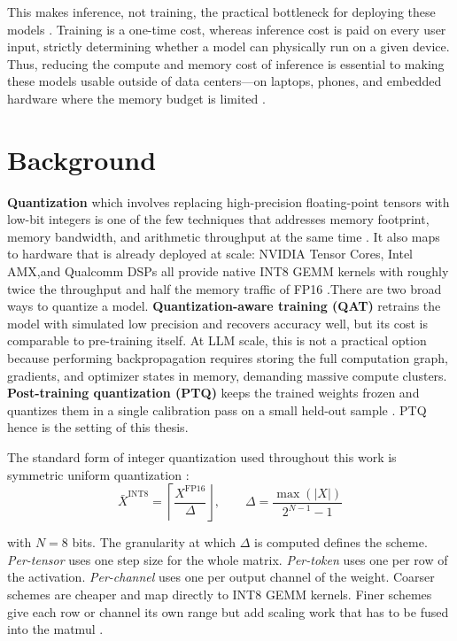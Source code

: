This makes inference, not training, the practical bottleneck for deploying these models \cite{smoothquant_paper, outlier_suppression_paper}. Training is a one-time cost, whereas inference cost is paid on every user input, strictly determining whether a model can physically run on a given device. Thus, reducing the compute and memory cost of inference is essential to making these models usable outside of data centers---on laptops, phones, and embedded hardware where the memory budget is limited \cite{llm_int8_paper, gptq_paper, awq_paper}.

\section{Background}
\textbf{Quantization} which involves replacing high-precision floating-point tensors with low-bit integers is one of the few techniques that addresses memory footprint, memory bandwidth, and arithmetic throughput at the same time \cite{gptq_paper, zeroquant_paper}. It also maps to hardware that is already deployed at scale: NVIDIA Tensor Cores, Intel AMX,and Qualcomm DSPs all provide native INT8 GEMM kernels with roughly twice the throughput and half the memory traffic of FP16 \cite{llm_int8_paper, smoothquant_paper}.There are two broad ways to quantize a model. \textbf{Quantization-aware training (QAT)} retrains the model with simulated low precision and recovers accuracy well, but its cost is comparable to pre-training itself. At LLM scale, this is not a practical option because performing backpropagation requires storing the full computation graph, gradients, and optimizer states in memory, demanding massive compute clusters. \textbf{Post-training quantization (PTQ)} keeps the trained weights frozen and quantizes them in a single calibration pass on a small held-out sample \cite{gptq_paper, awq_paper, zeroquant_paper}. PTQ hence is the setting of this thesis.

The standard form of integer quantization used throughout this work is symmetric uniform quantization \cite{smoothquant_paper, llm_int8_paper}:
\begin{equation}
\bar{X}^{\text{INT8}} = \left\lceil \frac{X^{\text{FP16}}}{\Delta} \right\rfloor, \qquad \Delta = \frac{\max(|X|)}{2^{N-1} - 1}
\end{equation}

with $N = 8$ bits. The granularity at which $\Delta$ is computed defines the scheme. \textit{Per-tensor} uses one step size for the whole matrix. \textit{Per-token} uses one per row of the activation. \textit{Per-channel} uses one per output channel of the weight. Coarser schemes are cheaper and map directly to INT8 GEMM kernels. Finer schemes give each row or channel its own range but add scaling work that has to be fused into the matmul \cite{smoothquant_paper, zeroquant_paper}.

